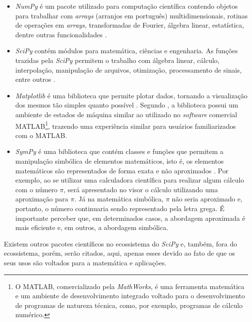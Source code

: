 \documentclass[
	12pt,				%
	openright,			%
    twoside,			%
	a4paper,			%
	chapter=TITLE,		%
	english,			%
	french,				%
	spanish,			%
	brazil				%
	]{abntex2}
\numberwithin{lema}{chapter}
\numberwithin{teorema}{chapter}
\numberwithin{definicao}{chapter}
\numberwithin{exemplo}{chapter}
\numberwithin{figure}{chapter}
\begin{document}
\begin{itemize}
	\item {}\textit{NumPy} é um pacote utilizado para computação científica contendo objetos para trabalhar com \textit{arrays} (arranjos em português) multidimensionais, rotinas de operações em \textit{arrays}, transformadas de Fourier, álgebra linear, estatística, dentre outras funcionalidades \cite{NumPy}.
	
	\item {}\textit{SciPy} contém módulos para matemática, ciências e engenharia. As funções trazidas pela \textit{SciPy} permitem o trabalho com álgebra linear, cálculo, interpolação, manipulação de arquivos, otimização, processamento de sinais, entre outros \cite{SciPy}.
	
	\item {}\textit{Matplotlib} é uma biblioteca que permite plotar dados, tornando a visualização dos mesmos tão simples quanto possível \cite{Matplotlib}. Segundo , a biblioteca possui um ambiente de estados de máquina similar ao utilizado no \textit{software} comercial MATLAB\footnote{O MATLAB, comercializado pela \textit{MathWorks}, é uma ferramenta matemática e um ambiente de desenvolvimento integrado voltado para o desenvolvimento de programas de natureza técnica, como, por exemplo, programas de cálculo numérico.}, trazendo uma experiência similar para usuários familiarizados com o MATLAB.
	
	\item {}\textit{SymPy} é uma biblioteca que contém classes e funções que permitem a manipulação simbólica de elementos matemáticos, isto é, os elementos matemáticos são representados de forma exata e não aproximados \cite{SymPy}. Por exemplo, ao se utilizar uma calculadora científica para realizar algum cálculo com o número $\pi$, será apresentado no visor o cálculo utilizando uma aproximação para $\pi$. Já na matemática simbólica, $\pi$ não seria aproximado e, portanto, o número continuaria sendo representado pela letra grega. É importante perceber que, em determinados casos, a abordagem aproximada é mais eficiente e, em outros, a abordagem simbólica.
\end{itemize}

Existem outros pacotes científicos no ecossistema do \textit{SciPy} e, também, fora do ecossistema, porém, serão citados, aqui, apenas esses devido ao fato de que os seus usos são voltados para a matemática e aplicações.
\end{document}

